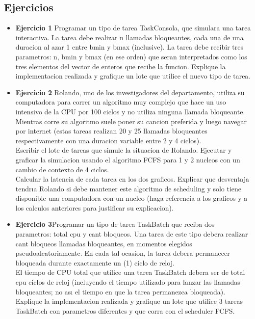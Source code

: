 
\subsection{Ejercicios}
\begin{itemize}
 \item \textbf{Ejercicio 1 } Programar un tipo de tarea TaskConsola, que simulara una tarea interactiva.
La tarea debe realizar n llamadas bloqueantes, cada una de una duracion al azar 1 entre bmin
y bmax (inclusive). La tarea debe recibir tres parametros: n, bmin y bmax (en ese orden)
que seran interpretados como los tres elementos del vector de enteros que recibe la funcion.
Explique la implementacion realizada y grafique un lote que utilice el nuevo tipo de tarea.
\item \textbf{Ejercicio 2} Rolando, uno de los investigadores del departamento, utiliza su computadora
para correr un algoritmo muy complejo que hace un uso intensivo de la CPU por 100 ciclos
y no utiliza ninguna llamada bloqueante. Mientras corre su algoritmo suele poner su cancion
preferida y luego navegar por internet (estas tareas realizan 20 y 25 llamadas bloqueantes
respectivamente con una duracion variable entre 2 y 4 ciclos).\\
Escribir el lote de tareas que simule la situacion de Rolando. Ejecutar y graficar la simulacion
usando el algoritmo FCFS para 1 y 2 nucleos con un cambio de contexto de 4 ciclos.\\
Calcular la latencia de cada tarea en los dos graficos. Explicar que desventaja tendrıa Rolando
si debe mantener este algoritmo de scheduling y solo tiene disponible una computadora con un
nucleo (haga referencia a los graficos y a los calculos anteriores para justificar su explicacion).
\item \textbf{Ejercicio 3}Programar un tipo de tarea TaskBatch que reciba dos parametros: total cpu y
cant bloqueos. Una tarea de este tipo debera realizar cant bloqueos llamadas bloqueantes, en
momentos elegidos pseudoaleatoriamente. En cada tal ocasion, la tarea debera permanecer
bloqueada durante exactamente un (1) ciclo de reloj. \\
El tiempo de CPU total que utilice una
tarea TaskBatch debera ser de total cpu ciclos de reloj (incluyendo el tiempo utilizado para
lanzar las llamadas bloqueantes; no ası el tiempo en que la tarea permanezca bloqueada).
Explique la implementacion realizada y grafique un lote que utilice 3 tareas TaskBatch con
parametros diferentes y que corra con el scheduler FCFS.
\end{itemize}

